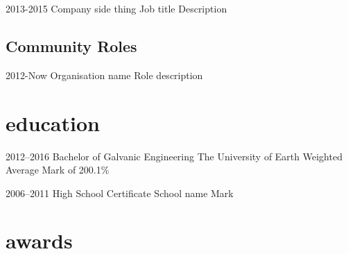 \documentclass[]{friggeri-cv} %
\begin{document}
\begin{entrylist}


\entry
{2013-2015}
{Company} 
{side thing}
{Job title}
{ 
Description
}




\end{entrylist}




\subsection{Community Roles}

\begin{entrylist}


\entry
{2012-Now}
{Organisation name} 
{}
{Role}
{
description
}




\end{entrylist}


\section{education}

\begin{entrylist} 


\entry
{2012--2016}
{Bachelor {\normalfont of Galvanic Engineering}}
{The University of Earth}
{Weighted Average Mark of 200.1\%} 
{
}


\entry
{2006--2011}  
{High School Certificate}
{School name}
{Mark} 
{
}


\end{entrylist}


\section{awards}
\end{document}
